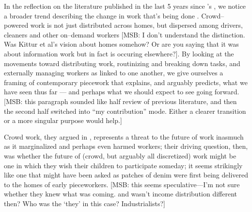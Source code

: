 \documentclass{sigchi}
\newcommand{\msb}[1]{{\color{PineGreen}[MSB: #1]}}
\begin{document}
In the reflection on the literature published in the last 5 years since
\citeauthor{crowdworkFuture}'s 
,
we notice a broader trend describing the change in work that's being done
\cite{crowdworkFuture}.
Crowd--powered work is not just distributed across homes,
but dispersed among drivers, cleaners and other on--demand workers \msb{I don't understand the distinction. Was Kittur et al's vision about homes somehow? Or are you saying that it was about information work but in fact is occuring elsewhere?}.
By looking at the movements toward
distributing work,
routinizing and breaking down tasks,
and externally managing workers
as linked to one another, 
we give ourselves a framing of contemporary piecework that explains,
and arguably predicts,
what we have seen thus far
--- and perhaps what we should expect to see going forward.
\msb{this paragraph sounded like half review of previous literature, and then the second half switched into ``my contribution'' mode. Either a clearer transition or a more singular purpose would help.}



Crowd work,
they argued in \citeyear{crowdworkFuture},
represents a threat to the future of work inasmuch as it marginalized
and perhaps even harmed
workers;
their driving question, then, was
whether the future of
(crowd, but arguably all discretized)
work might be one in which they wish their children to participate someday;
it seems strikingly like one that might have been asked
as patches of denim were first being delivered to the homes of early pieceworkers. \msb{this seems speculative---I'm not sure whether they knew what was coming. and wasn't income distribution different then? Who was the `they' in this case? Industrialists?}
\end{document}
